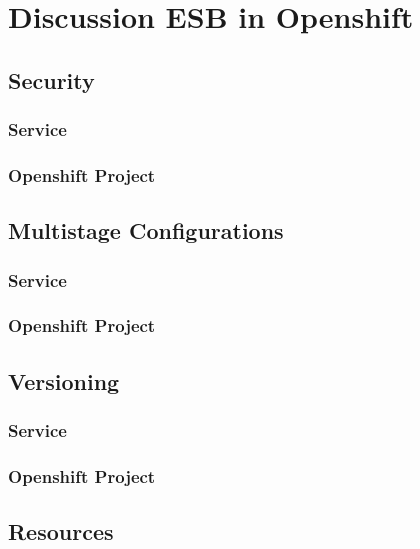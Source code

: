 \chapter{Discussion ESB in Openshift}
\label{cha:esbd}

\section{Security}
\label{sec:esbd-security}

\subsection{Service}
\label{sec:esbd-security-service}

\subsection{Openshift Project}
\label{sec:esbd-security-openshift}

\section{Multistage Configurations}
\label{sec:esbd-service-config}

\subsection{Service}
\label{sec:esbd-config-service}

\subsection{Openshift Project}
\label{sec:esbd-config-openshift}

\section{Versioning}
\label{sec:esbd-versioning}

\subsection{Service}
\label{sec:esbd-versioning-service}

\subsection{Openshift Project}
\label{sec:esbd-versioning-openshift}

\section{Resources}
\label{sec:esbd-resources}

